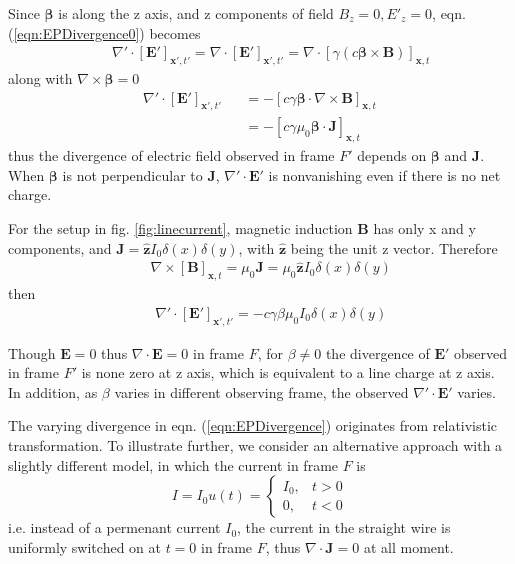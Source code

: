 \documentclass[prd,showpacs,twocolumn]{revtex4-1}
\begin{document}
Since $\boldsymbol\beta$ is along the z axis, and z components of field $B_z=0,E'_z=0$, eqn. (\ref{eqn:EPDivergence0}) becomes
\begin{eqnarray}
&&\nabla'\cdot[\mathbf{E'}]_{\mathbf{x'},t'}=\nabla\cdot[\mathbf{E'}]_{\mathbf{x'},t'}=\nabla\cdot[\gamma(c\boldsymbol\beta\times\mathbf{B})]_{\mathbf{x},t}
\label{eqn:EDivergence2}
\end{eqnarray}
along with $\nabla\times\boldsymbol\beta=0$
\begin{eqnarray}
\nabla'\cdot[\mathbf{E'}]_{\mathbf{x'},t'}&&=-[c\gamma\boldsymbol\beta\cdot\nabla\times\mathbf{B}]_{\mathbf{x},t}\nonumber\\
&&=-[c\gamma\mu_0\boldsymbol\beta\cdot\mathbf{J}]_{\mathbf{x},t}
\label{eqn:EPDivergence}
\end{eqnarray}
thus the divergence of electric field observed in frame $F'$ depends on $\boldsymbol\beta$ and $\mathbf{J}$. When $\boldsymbol\beta$ is not perpendicular to $\mathbf{J}$, $\nabla'\cdot\mathbf{E'}$ is nonvanishing even if there is no net charge.

For the setup in fig. \ref{fig:linecurrent}, magnetic induction $\mathbf{B}$ has only x and y components, and $\mathbf{J}=\hat{\mathbf{z}}I_0\delta(x)\delta(y)$, with $\hat{\mathbf{z}}$ being the unit z vector. Therefore 
\begin{eqnarray}
&&\nabla\times[\mathbf{B}]_{\mathbf{x},t}=\mu_0\mathbf{J}=\mu_0\hat{\mathbf{z}}I_0\delta(x)\delta(y)
\label{eqn:BCurl}
\end{eqnarray}
then
\begin{eqnarray}
&&\nabla'\cdot[\mathbf{E'}]_{\mathbf{x'},t'}=-c\gamma\beta\mu_0 I_0\delta(x)\delta(y)
\label{eqn:EPDivergence3}
\end{eqnarray}

Though $\mathbf{E}=0$ thus $\nabla\cdot\mathbf{E}=0$ in frame $F$, for $\beta\ne 0$ the divergence of $\mathbf{E'}$ observed in frame $F'$ is none zero at z axis, which is equivalent to a line charge at z axis. In addition, as $\beta$ varies in different observing frame, the observed $\nabla'\cdot\mathbf{E'}$ varies.

The varying divergence in eqn. (\ref{eqn:EPDivergence}) originates from relativistic transformation. To illustrate further, we consider an alternative approach with a slightly different model, in which the current in frame $F$ is
\begin{equation}
I=I_0u(t)=
\begin{cases}
I_0,&t>0\\
0,&t<0
\end{cases}
\label{eqn:ISwitchOn}
\end{equation}
i.e. instead of a permenant current $I_0$, the current in the straight wire is uniformly switched on at $t=0$ in frame $F$, thus $\nabla\cdot\mathbf{J}=0$ at all moment.
\end{document}
